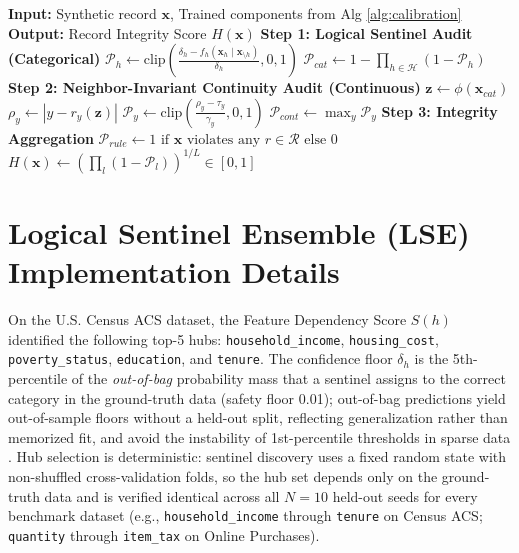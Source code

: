 \begin{algorithm}[ht]
\caption{HIF Synthetic Data Audit}
\label{alg:audit}
\begin{algorithmic}[1]
\Statex \textbf{Input:} Synthetic record $\mathbf{x}$, Trained components from Alg \ref{alg:calibration}
\Statex \textbf{Output:} Record Integrity Score $H(\mathbf{x})$
\State \textbf{Step 1: Logical Sentinel Audit (Categorical)}
    \State $\mathcal{P}_h \leftarrow \text{clip}\left( \frac{\delta_h - f_h(\mathbf{x}_h \mid \mathbf{x}_{\setminus h})}{\delta_h}, 0, 1 \right) $
\EndFor
\State $\mathcal{P}_{cat} \leftarrow 1 - \prod_{h \in \mathcal{H}} (1 - \mathcal{P}_h)$ 
\State \textbf{Step 2: Neighbor-Invariant Continuity Audit (Continuous)}
\State $\mathbf{z} \leftarrow \phi(\mathbf{x}_{cat})$ 
    \State $\rho_y \leftarrow |y - r_y(\mathbf{z})|$
    \State $\mathcal{P}_y \leftarrow \text{clip}\left( \frac{\rho_y - \tau_y}{\gamma_y}, 0, 1 \right)$
\EndFor
\State $\mathcal{P}_{cont} \leftarrow \max_y \mathcal{P}_y$
\State \textbf{Step 3: Integrity Aggregation}
\State $\mathcal{P}_{rule} \leftarrow 1 \text{ if } \mathbf{x} \text{ violates any } r \in \mathcal{R} \text{ else } 0$
\State $H(\mathbf{x}) \leftarrow \left( \prod_{l} (1 - \mathcal{P}_l) \right)^{1/L} \in [0, 1]$ 
\end{algorithmic}
\end{algorithm}

\section{Logical Sentinel Ensemble (LSE) Implementation Details}\label{app:lse_details}

On the U.S. Census ACS dataset, the Feature Dependency Score $S(h)$ identified the following top-5 hubs: \texttt{household\_income}, \texttt{housing\_cost}, \texttt{poverty\_status}, \texttt{education}, and \texttt{tenure}. The confidence floor $\delta_h$ is the 5th-percentile of the \emph{out-of-bag} probability mass that a sentinel assigns to the correct category in the ground-truth data (safety floor 0.01); out-of-bag predictions yield out-of-sample floors without a held-out split, reflecting generalization rather than memorized fit, and avoid the instability of 1st-percentile thresholds in sparse data \cite{karabulut2025neurosymbolic, long2025evaluating}. Hub selection is deterministic: sentinel discovery uses a fixed random state with non-shuffled cross-validation folds, so the hub set depends only on the ground-truth data and is verified identical across all $N=10$ held-out seeds for every benchmark dataset (e.g., \texttt{household\_income} through \texttt{tenure} on Census ACS; \texttt{quantity} through \texttt{item\_tax} on Online Purchases).

